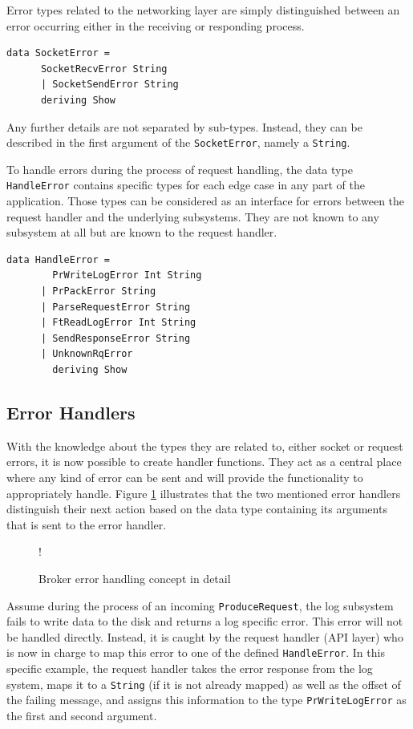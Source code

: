 Error types related to the networking layer are simply distinguished between an
error occurring either in the receiving or responding process.

\begin{lstlisting}[caption={SocketError type}]
data SocketError =
      SocketRecvError String
      | SocketSendError String
      deriving Show
\end{lstlisting}

Any further details are not separated by sub-types. Instead, they can be described
in the first argument of the \lstinline{SocketError}, namely a
\lstinline{String}.

To handle errors during the process of request handling, the data type
\lstinline{HandleError} contains specific types for each edge case in any part
of the application. Those types can be considered as an interface for errors
between the request handler and the underlying subsystems. They are not known to
any subsystem at all but are known to the request handler.

\begin{lstlisting}[caption={Handle Error type}]
data HandleError =
        PrWriteLogError Int String
      | PrPackError String
      | ParseRequestError String
      | FtReadLogError Int String
      | SendResponseError String
      | UnknownRqError
        deriving Show
\end{lstlisting}

\subsection{Error Handlers}

With the knowledge about the types they are related to, either socket or request
errors, it is now possible to create handler functions. They act as a central
place where any kind of error can be sent and will provide the
functionality to appropriately handle. Figure
\ref{fig:broker-error-activity-detail} illustrates that the two
mentioned error handlers distinguish their next action based on the data type
containing its arguments that is sent to the error handler.

\begin{figure}[H]
  \centering
   {!} {
    
  }
  \caption{Broker error handling concept in detail}
  \label{fig:broker-error-activity-detail}
\end{figure}

Assume during the process of an incoming \lstinline{ProduceRequest}, the log
subsystem fails to write data to the disk and returns a log specific error. This
error will not be handled directly. Instead, it is caught by the request handler
(API layer) who is now in charge to map this error to one of the defined
\lstinline{HandleError}. In this specific example, the request handler takes the error response from the log system, maps it to a \lstinline{String}
(if it is not already mapped) as well as the offset of the failing message, and assigns this
information to the type \lstinline{PrWriteLogError} as the first and second
argument. \\

